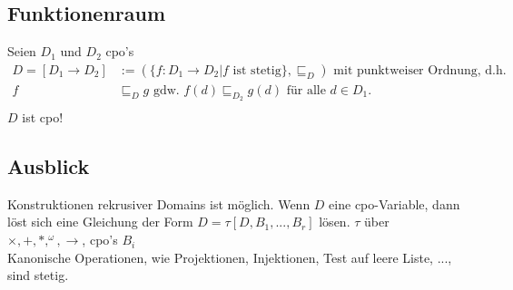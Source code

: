 \subsection{Funktionenraum}
Seien $D_1$ und $D_2$ cpo's
\begin{align*}
D = [D_1 \rightarrow D_2] &:= (\{ f : D_1 \rightarrow D_2 | f \text{ ist stetig}\}, \sqsubseteq_{D}) \text{ mit punktweiser Ordnung, d.h.}\\
f &\sqsubseteq_{D} g \text{ gdw. } f(d) \sqsubseteq_{D_2} g(d) \text{ für alle } d \in D_1 \text{.} \\
\end{align*}
$D$ ist cpo!\\
\subsection{Ausblick}
Konstruktionen rekrusiver Domains ist möglich. Wenn $D$ eine cpo-Variable, dann löst sich eine Gleichung der Form $D = \tau [D, B_1,...,B_r]$ lösen. $\tau$ über $\times, +, *, ^\omega, \rightarrow $, cpo's $B_i$\\ 
Kanonische Operationen, wie Projektionen, Injektionen, Test auf leere Liste, ..., sind stetig.\\
